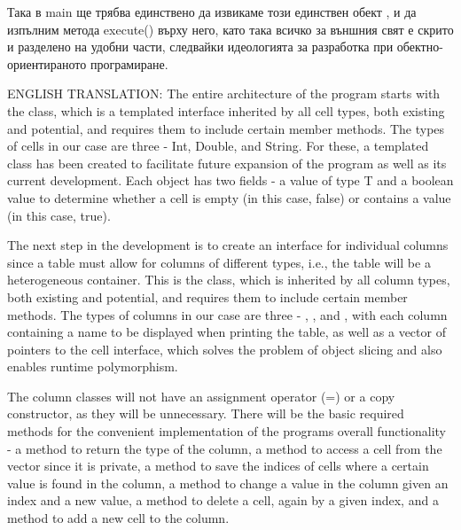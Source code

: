Така в main ще трябва единствено да извикаме този единствен обект , и да изпълним метода execute() върху него, като така всичко за външния свят е скрито и разделено на удобни части, следвайки идеологията за разработка при обектно-\/ориентираното програмиране.

ENGLISH TRANSLATION\+: The entire architecture of the program starts with the  class, which is a templated interface inherited by all cell types, both existing and potential, and requires them to include certain member methods. The types of cells in our case are three -\/ Int, Double, and String. For these, a templated class  has been created to facilitate future expansion of the program as well as its current development. Each  object has two fields -\/ a value of type T and a boolean value to determine whether a cell is empty (in this case, false) or contains a value (in this case, true).

The next step in the development is to create an interface for individual columns since a table must allow for columns of different types, i.\+e., the table will be a heterogeneous container. This is the  class, which is inherited by all column types, both existing and potential, and requires them to include certain member methods. The types of columns in our case are three -\/ , , and , with each column containing a name to be displayed when printing the table, as well as a vector of pointers to the cell interface, which solves the problem of object slicing and also enables runtime polymorphism.

The column classes will not have an assignment operator (=) or a copy constructor, as they will be unnecessary. There will be the basic required methods for the convenient implementation of the program\textquotesingle{}s overall functionality -\/ a method to return the type of the column, a method to access a cell from the vector since it is private, a method to save the indices of cells where a certain value is found in the column, a method to change a value in the column given an index and a new value, a method to delete a cell, again by a given index, and a method to add a new cell to the column.

